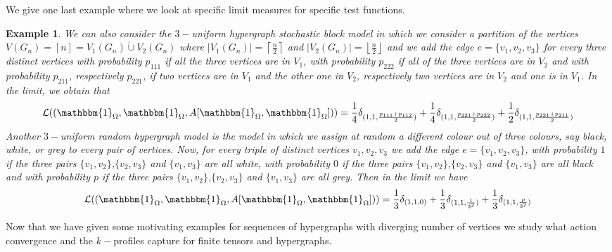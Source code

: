 \documentclass[11pt]{article}
\newtheorem{example}[theorem]{Example}
\begin{document}
\endproof


We give one last example where we look at specific limit measures for specific test functions.


\begin{example}
    We can also consider the $3-$uniform hypergraph stochastic block model in which we consider a partition of the vertices $V(G_n)=[n]=V_1(G_n)\dot{\cup}V_2(G_n)$ where $|V_1(G_n)|=\left \lceil{\frac{n}{2}}\right \rceil $ and $|V_2(G_n)|=\left \lfloor{\frac{n}{2}}\right \rfloor$ and we add the edge $e=\{v_1,v_2,v_3\}$ for every three distinct vertices with probability $p_{111}$ if all the three vertices are in $V_1$, with probability $p_{222}$ if all of the three vertices are in $V_2$ and with probability $p_{211}$, respectively $p_{221}$, if two vertices are in $V_1$ and the other one in $V_2$, respectively two vertices are in $V_2$ and one is in $V_1$. In the limit, we obtain that 
$$
\mathcal{L}((\mathbbm{1}_{\Omega},\mathbbm{1}_{\Omega},A[\mathbbm{1}_{\Omega},\mathbbm{1}_{\Omega}]))=\frac{1}{4}\delta_{(1,1,\frac{p_{111}+p_{112}}{2})}+\frac{1}{4}\delta_{(1,1,\frac{p_{221}+p_{222}}{2})}+\frac{1}{2}\delta_{(1,1,\frac{p_{221}+p_{211}}{2})}
$$
Another $3-$uniform random hypergraph model is the model in which we assign at random a different colour out of three colours, say black, white, or grey to every pair of vertices. Now, for every triple of distinct vertices $v_1,v_2,v_3$ we add the edge $e=\{v_1,v_2,v_3\}$,  with probability $1$ if the three pairs $\{v_1,v_2\}$,$\{v_2,v_3\}$ and $\{v_1,v_3\}$ are all white, with probability $0$ if the three pairs $\{v_1,v_2\}$,$\{v_2,v_3\}$ and $\{v_1,v_3\}$ are all black and with probability $p$ if the three pairs $\{v_1,v_2\}$,$\{v_2,v_3\}$ and $\{v_1,v_3\}$ are all grey. Then in the limit we have
$$
\mathcal{L}((\mathbbm{1}_{\Omega},\mathbbm{1}_{\Omega},A[\mathbbm{1}_{\Omega},\mathbbm{1}_{\Omega}]))=\frac{1}{3}\delta_{(1,1,0)}+\frac{1}{3}\delta_{(1,1,\frac{1}{3^2})}+\frac{1}{3}\delta_{(1,1,\frac{p}{3^2})}
$$
\end{example}%

Now that we have given some motivating examples for sequences of hypergraphs with diverging number of vertices we study what action convergence and the $k-$profiles capture for finite tensors and hypergraphs.  
\end{document}
